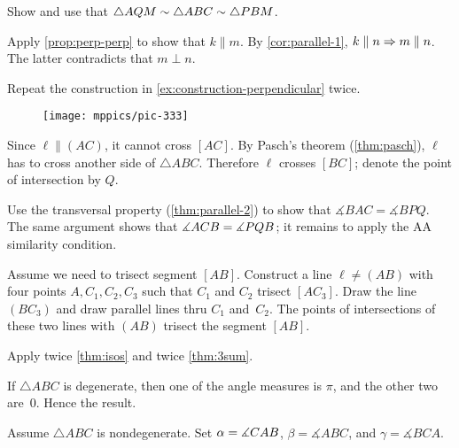 \begin{multicols}{2}
Show and use that $\triangle AQM\sim \triangle ABC\z\sim\triangle PBM$.


\setcounter{eqtn}{0}


Apply \ref{prop:perp-perp} to show that $k\parallel m$.
By \ref{cor:parallel-1}, $k\parallel n\z\Rightarrow m\parallel n$.
The latter contradicts that $m\perp n$.

Repeat the construction in \ref{ex:construction-perpendicular} twice.

{

\begin{wrapfigure}{r}{23mm}
\vskip-5mm
\centering
\texttt{[image: mppics/pic-333]}
\end{wrapfigure} 

Since  $\ell\parallel (AC)$, it cannot cross $[AC]$.
By Pasch's theorem (\ref{thm:pasch}), $\ell$ has to cross another side of $\triangle ABC$.
Therefore $\ell$ crosses $[BC]$; denote the point of intersection by $Q$.

Use the transversal property (\ref{thm:parallel-2}) to show that $\measuredangle BAC= \measuredangle BPQ$.
The same argument shows that $\measuredangle ACB\z= \measuredangle PQB$; it remains to apply the AA similarity condition.

}

Assume we need to trisect segment $[AB]$.
Construct a line $\ell\ne (AB)$ with four points $A,C_1,C_2, C_3$
such that $C_1$ and $C_2$ trisect $[AC_3]$.
Draw the line $(BC_3)$
and draw parallel lines thru $C_1$ and~$C_2$.
The points of intersections of these two lines with $(AB)$ trisect the segment $[AB]$.

Apply twice \ref{thm:isos} and twice \ref{thm:3sum}.


If $\triangle ABC$ is degenerate, then one of the angle measures is $\pi$, and the other two are~$0$.
Hence the result.

Assume $\triangle ABC$ is nondegenerate.
Set $\alpha\z=\measuredangle CAB$, $\beta=\measuredangle ABC$, and $\gamma=\measuredangle BCA$.


\end{multicols}
